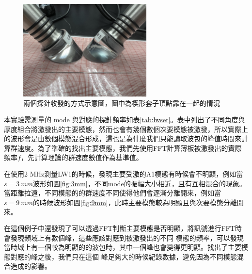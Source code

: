 \documentclass[12pt]{report}
\begin{document}
\begin{figure}[htbp]
    \centering
    \includegraphics[width=0.6\textwidth]{f2f.jpeg}
    \caption{兩個探針收發的方式示意圖，圖中為楔形套子頂點靠在一起的情況}
    \label{fig:f2f}
\end{figure}
 
本實驗需測量的 mode 與對應的探針頻率如表\ref{tab:lwset}。表中列出了不同角度與厚度組合將激發出的主要模態，然而也會有幾個數個次要模態被激發，所以實際上的波形會是由數個模態混合形成，這也是為什麼我們只能讀取波包的峰值時間來計算群速度。為了準確的找出主要模態，我們先使用FFT計算薄板被激發出的實際頻率$f$，先計算理論的群速度數值作為基準值。

在使用2 MHz測量LW1的時候，發現主要受激的A1模態有時候會不明顯，例如當$s=\SI{3}{mm}$波形如圖\ref{fig:3mm}，不同mode的振幅大小相近，且有互相混合的現象。當距離拉遠，不同模態的的群速度不同使得他們會逐漸分離開來，例如當$s=\SI{9}{mm}$的時候波形如圖\ref{fig:9mm}，此時主要模態較為明顯且與次要模態分離開來。

在這個例子中還發現了可以透過FFT判斷主要模態是否明顯，將訊號進行FFT時會發現頻域上有數個峰，這些應該對應到被激發出的不同
模態的頻率，可以發現當時域上有一個較為明顯的的波包時，其中一個峰也會變得更明顯。找出了主要模態對應的峰之後，我們只在這個
峰足夠大的時候紀錄數據，避免因為不同模態混合造成的影響。
\end{document}
